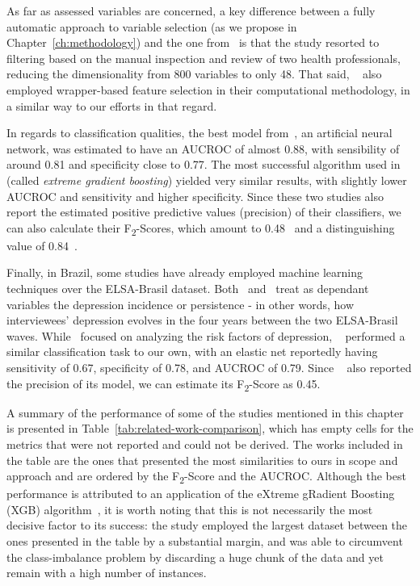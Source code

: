 As far as assessed variables are concerned, a key difference between a fully automatic approach to variable selection (as we propose in Chapter~\ref{ch:methodology}) and the one from~\citet{Oh2020} is that the study resorted to filtering based on the manual inspection and review of two health professionals, reducing the dimensionality from 800 variables to only 48.
That said, ~\citet{Oh2020} also employed wrapper-based feature selection in their computational methodology, in a similar way to our efforts in that regard.

In regards to classification qualities, the best model from~\citet{Jung2019}, an artificial neural network, was estimated to have an AUCROC of almost 0.88, with sensibility of around 0.81 and specificity close to 0.77.
The most successful algorithm used in ~\citet{Jung2019} (called \textit{extreme gradient boosting}) yielded very similar results, with slightly lower AUCROC and sensitivity and higher specificity.
Since these two studies also report the estimated positive predictive values (precision) of their classifiers, we can also calculate their F\textsubscript{2}-Scores, which amount to 0.48~\cite{Oh2020} and a distinguishing value of 0.84~\cite{Jung2019}.

Finally, in Brazil, some studies have already employed machine learning techniques over the ELSA-Brasil dataset.
Both~\citet{Brunoni2020} and~\citet{Librenza-Garcia2020} treat as dependant variables the depression incidence or persistence - in other words, how interviewees' depression evolves in the four years between the two ELSA-Brasil waves.
While~\citet{Brunoni2020} focused on analyzing the risk factors of depression, ~\citet{Librenza-Garcia2020} performed a similar classification task to our own, with an elastic net reportedly having sensitivity of 0.67, specificity of 0.78, and AUCROC of 0.79.
Since ~\citet{Librenza-Garcia2020} also reported the precision of its model, we can estimate its F\textsubscript{2}-Score as 0.45.

A summary of the performance of some of the studies mentioned in this chapter is presented in Table~\ref{tab:related-work-comparison}, which has empty cells for the metrics that were not reported and could not be derived.
The works included in the table are the ones that presented the most similarities to ours in scope and approach and are ordered by the F\textsubscript{2}-Score and the AUCROC\@.
Although the best performance is attributed to an application of the eXtreme gRadient Boosting (XGB) algorithm~\cite{Jung2019}, it is worth noting that this is not necessarily the most decisive factor to its success: the study employed the largest dataset between the ones presented in the table by a substantial margin, and was able to circumvent the class-imbalance problem by discarding a huge chunk of the data and yet remain with a high number of instances.

